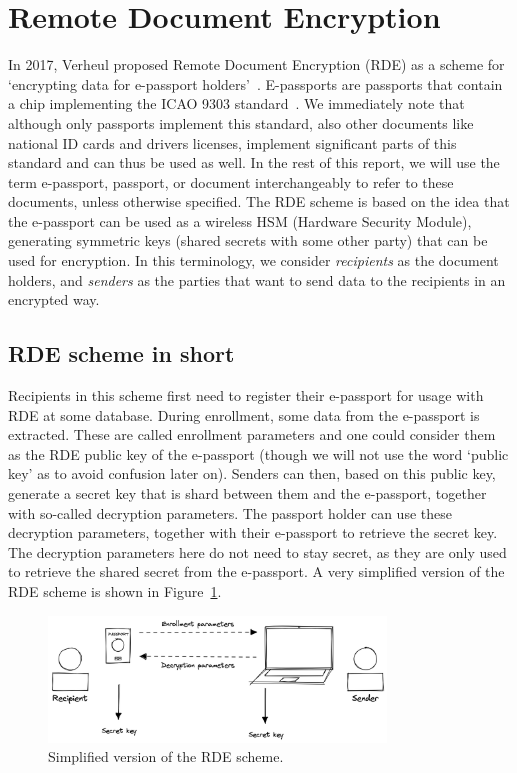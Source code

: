 \section{Remote Document Encryption}\label{sec:remote-document-encryption}
In 2017, Verheul proposed Remote Document Encryption (RDE) as a scheme for `encrypting data for e-passport holders'~\cite{verheul2017remote}.
E-passports are passports that contain a chip implementing the ICAO 9303 standard~\cite{icao9303securitymechanisms}.
We immediately note that although only passports implement this standard, also other documents like national ID cards and drivers licenses, implement significant parts of this standard and can thus be used as well.
In the rest of this report, we will use the term e-passport, passport, or document interchangeably to refer to these documents, unless otherwise specified.
The RDE scheme is based on the idea that the e-passport can be used as a wireless HSM (Hardware Security Module), generating symmetric keys (shared secrets with some other party) that can be used for encryption.
In this terminology, we consider \textit{recipients} as the document holders, and \textit{senders} as the parties that want to send data to the recipients in an encrypted way.

\subsection{RDE scheme in short}\label{subsec:rde-scheme-in-short}
Recipients in this scheme first need to register their e-passport for usage with RDE at some database.
During enrollment, some data from the e-passport is extracted.
These are called enrollment parameters and one could consider them as the RDE public key of the e-passport (though we will not use the word `public key' as to avoid confusion later on).
Senders can then, based on this public key, generate a secret key that is shard between them and the e-passport, together with so-called decryption parameters.
The passport holder can use these decryption parameters, together with their e-passport to retrieve the secret key.
The decryption parameters here do not need to stay secret, as they are only used to retrieve the shared secret from the e-passport.
A very simplified version of the RDE scheme is shown in Figure~\ref{fig:rde-scheme-very-simple}.
\begin{figure}
    \centering
    \includegraphics[width=0.8\textwidth]{imgs/RDE very simple}
    \caption{Simplified version of the RDE scheme.}
    \label{fig:rde-scheme-very-simple}
\end{figure}

